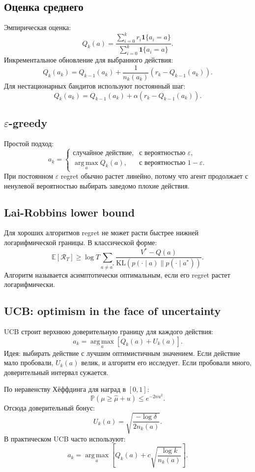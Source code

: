 \documentclass[11pt,a4paper]{article}
\newcommand{\E}{\mathbb{E}}
\renewcommand{\Prob}{\mathbb{P}}
\newcommand{\KL}{\mathrm{KL}}
\newcommand{\argmax}{\operatorname*{arg\,max}}
\newcommand{\1}{\mathbf{1}}
\begin{document}
\subsection*{Оценка среднего}
Эмпирическая оценка:
\[
    Q_k(a)=\frac{\sum_{i=0}^{k}r_i\1\{a_i=a\}}{\sum_{i=0}^{k}\1\{a_i=a\}}.
\]
Инкрементальное обновление для выбранного действия:
\[
    Q_k(a_k)=Q_{k-1}(a_k)+\frac1{n_k(a_k)}\left(r_k-Q_{k-1}(a_k)\right).
\]
Для нестационарных бандитов используют постоянный шаг:
\[
    Q_k(a_k)=Q_{k-1}(a_k)+\alpha(r_k-Q_{k-1}(a_k)).
\]

\subsection*{$\varepsilon$-greedy}
Простой подход:
\[
    a_k=\begin{cases}
    \text{случайное действие},&\text{с вероятностью }\varepsilon,\\
    \argmax_a Q_k(a),&\text{с вероятностью }1-\varepsilon.
    \end{cases}
\]
При постоянном $\varepsilon$ regret обычно растет линейно, потому что агент продолжает с ненулевой вероятностью выбирать заведомо плохие действия.

\subsection*{Lai-Robbins lower bound}
Для хороших алгоритмов regret не может расти быстрее нижней логарифмической границы. В классической форме:
\[
    \E[\mathcal R_T]\ge
    \log T\sum_{a\ne a^*}
    \frac{V^*-Q(a)}{\KL(p(\cdot\mid a)\|p(\cdot\mid a^*))}.
\]
Алгоритм называется асимптотически оптимальным, если его regret растет логарифмически.

\subsection*{UCB: optimism in the face of uncertainty}
UCB строит верхнюю доверительную границу для каждого действия:
\[
    a_k=\argmax_a\left[Q_k(a)+U_k(a)\right].
\]
Идея: выбирать действие с лучшим оптимистичным значением. Если действие мало пробовали, $U_k(a)$ велик, и алгоритм его исследует. Если пробовали много, доверительный интервал сужается.

По неравенству Хёффдинга для наград в $[0,1]$:
\[
    \Prob(\mu\ge \hat\mu+u)\le e^{-2nu^2}.
\]
Отсюда доверительный бонус:
\[
    U_k(a)=\sqrt{\frac{-\log\delta}{2n_k(a)}}.
\]
В практическом UCB часто используют:
\[
    a_k=\argmax_a\left[Q_k(a)+c\sqrt{\frac{\log k}{n_k(a)}}\right].
\]
\end{document}
